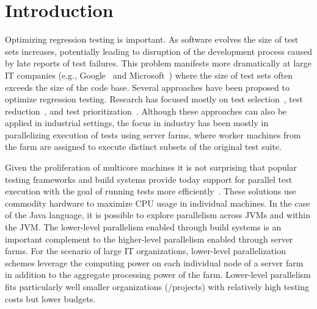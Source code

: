 \section{Introduction}

Optimizing regression testing is important.  As software evolves the
size of test sets increases, potentially leading to disruption of the
development process caused by late reports of test failures.  This
problem manifests more dramatically at large IT companies
(e.g., Google~ and
Microsoft~) where the size of test sets often exceeds the
size of the code base.  Several approaches have been proposed to
optimize regression testing.  Research has focused mostly on test
selection~, test reduction~, and test
prioritization~.  Although these approaches can also be
applied in industrial settings, the focus in industry has been mostly
in parallelizing execution of tests using server farms, where worker
machines from the farm are assigned to execute distinct subsets of the
original test suite.

Given the proliferation of multicore machines it is not surprising
that popular testing frameworks and build systems provide today
support for parallel test execution with the goal of running tests
more efficiently~\cite{junit-org,testng,nunit,maven-surefire-plugin}.
These solutions use commodity hardware to maximize CPU usage in
individual machines.  In the case of the Java language, it is possible
to explore parallelism across JVMs and within the JVM.  The
lower-level parallelism enabled through build systems is an important
complement to the higher-level parallelism enabled through server
farms.  For the scenario of large IT organizations, lower-level
parallelization schemes leverage the computing power on each
individual node of a server farm in addition to the aggregate
processing power of the farm.  Lower-level parallelism fits
particularly well smaller organizations (/projects) with relatively
high testing costs but lower budgets.


